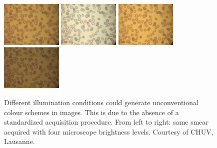 \documentclass[final,a4paper,12pt,english]{UnicaPhdThesis3}
\begin{document}
{\begin{figure}[!t]
	\centering    
	\includegraphics[width=2.9cm]{images/malaria/f1a}
	\includegraphics[width=2.9cm]{images/malaria/f1b}
	\includegraphics[width=2.9cm]{images/malaria/f1c}
	\includegraphics[width=2.9cm]{images/malaria/f1d}
	\caption{\label{f1_img_types} Different illumination conditions could generate unconventional colour schemes in images. This is due to the absence of a standardized acquisition procedure. From left to right: same smear acquired with four microscope brightness levels. Courtesy of CHUV, Lausanne.}
\end{figure}

}
\end{document}
